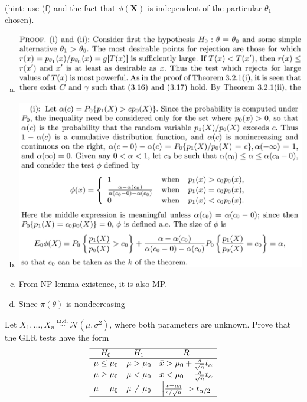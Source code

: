 \begin{ex}
\begin{enumerate}[(a)]
        (hint: use (f) and the fact that \(\phi(\mathbf{X})\) is independent of the particular \(\theta_{1}\) chosen). 
    \end{enumerate}
\end{ex}

\begin{solution}
    \begin{enumerate}[(a)]
        \item \includegraphics[width=.9\textwidth]{Proof 1.jpeg}
        \item \includegraphics[width=.9\textwidth]{Proof 2.png}
        \item From NP-lemma existence, it is also MP. 
        \item Since $\pi(\theta)$ is nondecreasing 
    \end{enumerate}
\end{solution}


\begin{ex}
    Let \(X_{1}, \ldots, X_{n} \stackrel{\text { i.i.d. }}{\sim} \mathcal{N}\left(\mu, \sigma^{2}\right)\), where both parameters are unknown. Prove that the GLR tests have the form
    \[
        \begin{array}{ccc}
        \hline H_{0} & H_{1} & R \\
        \hline \mu \leq \mu_{0} & \mu>\mu_{0} & \bar{x}>\mu_{0}+\frac{s}{\sqrt{n}} t_{\alpha} \\
        \mu \geq \mu_{0} & \mu<\mu_{0} & \bar{x}<\mu_{0}-\frac{s}{\sqrt{n}} t_{\alpha} \\
        \mu=\mu_{0} & \mu \neq \mu_{0} & \left|\frac{\bar{x}-\mu_{0}}{s / \sqrt{n}}\right|>t_{\alpha / 2} \\
        \hline
        \end{array}
    \]
\end{ex}

